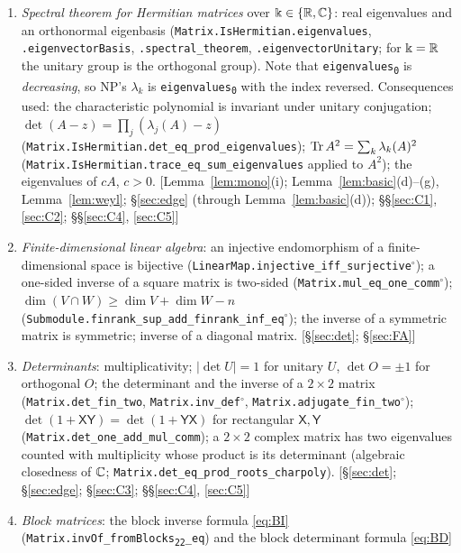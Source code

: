 \begin{enumerate}[leftmargin=2em,itemsep=1pt]\raggedright
\item \emph{Spectral theorem for Hermitian matrices} over $\Bbbk\in\{\mathbb{R},\mathbb{C}\}$: real eigenvalues and an orthonormal eigenbasis (\texttt{Matrix.IsHermitian.eigenvalues}, \texttt{.eigenvectorBasis},
\texttt{.spectral\_theorem}, \texttt{.eigenvectorUnitary}; for $\Bbbk=\mathbb{R}$ the unitary group is the orthogonal group). Note that \texttt{eigenvalues\textsubscript{0}} is \emph{decreasing}, so NP's $\lambda_k$ is
\texttt{eigenvalues\textsubscript{0}} with the index reversed. Consequences used: the characteristic polynomial is invariant under unitary conjugation;
$\det(A-z)=\prod_j(\lambda_j(A)-z)$ (\texttt{Matrix.IsHermitian.det\_eq\_prod\_eigenvalues}); $\operatorname{Tr} A^2=\sum_k\lambda_k(A)^2$ (\texttt{Matrix.IsHermitian.trace\_eq\_sum\_eigenvalues} applied to $A^2$);
the eigenvalues of $cA$, $c>0$. \hfill[Lemma~\ref{lem:mono}(i); Lemma~\ref{lem:basic}(d)--(g), Lemma~\ref{lem:weyl}; \S\ref{sec:edge} (through Lemma~\ref{lem:basic}(d)); \S\S\ref{sec:C1}, \ref{sec:C2}; \S\S\ref{sec:C4}, \ref{sec:C5}]
\item \emph{Finite-dimensional linear algebra}: an injective endomorphism of a finite-dimensional space is bijective (\texttt{LinearMap.injective\_iff\_surjective}$^\circ$); a one-sided inverse of a square
matrix is two-sided (\texttt{Matrix.mul\_eq\_one\_comm}$^\circ$); $\dim(V\cap W)\ge\dim V+\dim W-n$ (\texttt{Submodule.finrank\_sup\_add\_finrank\_inf\_eq}$^\circ$); the inverse of a symmetric matrix is symmetric;
inverse of a diagonal matrix. \hfill[\S\ref{sec:det}; \S\ref{sec:FA}]
\item \emph{Determinants}: multiplicativity; $|\det U|=1$ for unitary $U$, $\det O=\pm1$ for orthogonal $O$; the determinant and the inverse of a $2\times2$ matrix (\texttt{Matrix.det\_fin\_two},
\texttt{Matrix.inv\_def}$^\circ$, \texttt{Matrix.adjugate\_fin\_two}$^\circ$); $\det(1+\mathsf X\mathsf Y)=\det(1+\mathsf Y\mathsf X)$ for rectangular $\mathsf X,\mathsf Y$ (\texttt{Matrix.det\_one\_add\_mul\_comm});
a $2\times2$ complex matrix has two eigenvalues counted with multiplicity whose product is its determinant (algebraic closedness of $\mathbb{C}$; \texttt{Matrix.det\_eq\_prod\_roots\_charpoly}).
\hfill[\S\ref{sec:det}; \S\ref{sec:edge}; \S\ref{sec:C3}; \S\S\ref{sec:C4}, \ref{sec:C5}]
\item \emph{Block matrices}: the block inverse formula \eqref{eq:BI} (\texttt{Matrix.invOf\_fromBlocks\textsubscript{22}\_eq}) and the block determinant formula \eqref{eq:BD}

\end{enumerate}
